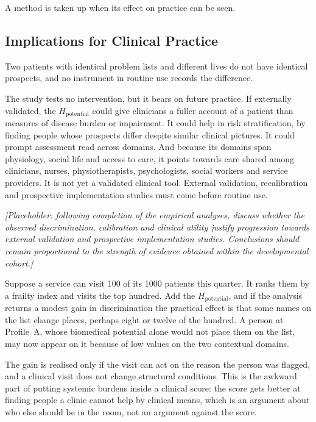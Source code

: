 A method is taken up when its effect on practice can be seen.

\subsection{Implications for Clinical Practice}
\label{sec:disc-impl-clinical}

Two patients with identical problem lists and different lives do not have
identical prospects, and no instrument in routine use records the difference.

The study tests no intervention, but it bears on future practice. If externally validated, the $H_{\text{potential}}$ could give clinicians a fuller account of a patient than measures of disease burden or impairment. It could help in risk stratification, by finding people whose prospects differ despite similar clinical pictures. It could prompt assessment read across domains. And because its domains span physiology, social life and access to care, it points towards care shared among clinicians, nurses, physiotherapists, psychologists, social workers and service providers. It is not yet a validated clinical tool. External validation, recalibration and prospective implementation studies must come before routine use.

\medskip
\noindent\emph{[Placeholder: following completion of the empirical analyses, discuss whether the observed discrimination, calibration and clinical utility justify progression towards external validation and prospective implementation studies. Conclusions should remain proportional to the strength of evidence obtained within the developmental cohort.]}

\begin{reading}
Suppose a service can visit 100 of its 1000 patients this quarter. It ranks them
by a frailty index and visits the top hundred. Add the $H_{\text{potential}}$,
and if the analysis returns a modest gain in discrimination the practical effect
is that some names on the list change places, perhaps eight or twelve of the
hundred. A person at Profile~A, whose biomedical potential alone would not
place them on the list, may now appear on it because of low values on the two
contextual domains.

The gain is realised only if the visit can act on the reason the person was
flagged, and a clinical visit does not change structural conditions. This is the awkward part of putting
systemic burdens inside a clinical score: the score gets better at finding people
a clinic cannot help by clinical means, which is an argument about who else
should be in the room, not an argument against the score.
\end{reading}

